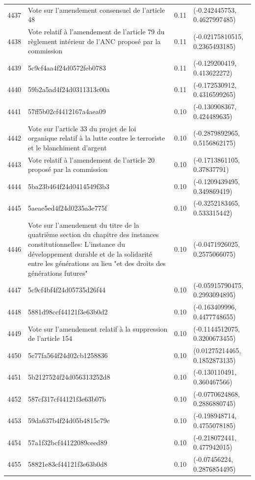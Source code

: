 \begin{table}[ht]
\begin{tabular}{rlrl}
  4437 & Vote sur l'amendement consensuel de l'article 48 & 0.11 & (-0.242445753, 0.4627997485) \\ 
  4438 & Vote relatif à l'amendement de l'article 79 du règlement intérieur de l'ANC proposé par la commission & 0.11 & (-0.02175810515, 0.2365493185) \\ 
  4439 & 5c9cf4aa4f24d0572feb0783 & 0.11 & (-0.129200419, 0.413622272) \\ 
  4440 & 59b2a5ad4f24d0311313c00a & 0.11 & (-0.172530912, 0.4316599265) \\ 
  4441 & 57ff5b02cf4412167a4aea09 & 0.10 & (-0.130908367, 0.424489635) \\ 
  4442 & Vote sur l'article 33 du projet de loi organique relatif à la lutte contre le terroriste et le blanchiment d'argent & 0.10 & (-0.2879892965, 0.5156862175) \\ 
  4443 & Vote relatif à l'amendement de l'article 20 proposé par la commission & 0.10 & (-0.1713861105, 0.37837791) \\ 
  4444 & 5ba23b464f24d0414549f3b3 & 0.10 & (-0.1209439495, 0.349869419) \\ 
  4445 & 5aeae5ed4f24d0235a3e775f & 0.10 & (-0.3252183465, 0.533315442) \\ 
  4446 & Vote sur l'amendement du titre de la quatrième section du chapitre des instances constitutionnelles: L'instance du développement durable et de la solidarité entre les générations au lieu "et des droits des générations futures" & 0.10 & (-0.0471926025, 0.2575066075) \\ 
  4447 & 5c9cf4bf4f24d05735d26f44 & 0.10 & (-0.05915790475, 0.2993094895) \\ 
  4448 & 5881d98ccf44121f3e63b0d2 & 0.10 & (-0.163409996, 0.4477748655) \\ 
  4449 & Vote sur l'amendement relatif à la suppression de l'article 154 & 0.10 & (-0.1144512075, 0.3200673455) \\ 
  4450 & 5c77fa564f24d02cb1258836 & 0.10 & (0.01275214465, 0.1852873135) \\ 
  4451 & 5b2127524f24d056313252d8 & 0.10 & (-0.130110491, 0.360467566) \\ 
  4452 & 587cf317cf44121f3e63b07b & 0.10 & (-0.0770624868, 0.2886880745) \\ 
  4453 & 59da637b4f24d05b4815c79c & 0.10 & (-0.198948714, 0.4755078185) \\ 
  4454 & 57a1f32bcf44122089ceed89 & 0.10 & (-0.218072441, 0.477942015) \\ 
  4455 & 58821e83cf44121f3e63b0d8 & 0.10 & (-0.07456224, 0.2876854495) \\ 

\end{tabular}
\end{table}
